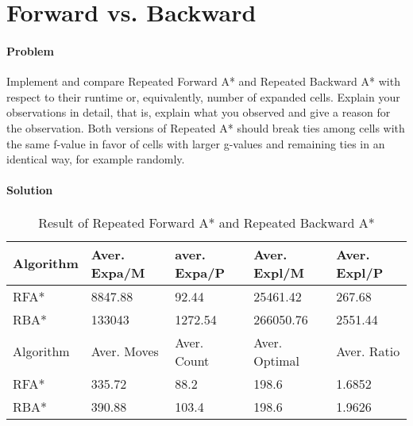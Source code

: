 \section{Forward vs. Backward}

\paragraph{Problem}
Implement and compare Repeated Forward A* and Repeated Backward A* with respect
to their runtime or, equivalently, number of expanded cells. Explain your
observations in detail, that is, explain what you observed and give a reason
for the observation. Both versions of Repeated A* should break ties among cells
with the same f-value in favor of cells with larger g-values and remaining ties
in an identical way, for example randomly.

\paragraph{Solution}

\begin{table}[h!]
\centering
\caption{Result of Repeated Forward A* and Repeated Backward A*}
\begin{tabular}{|l|l|l|l|l|}
\hline
Algorithm & Aver. Expa/M & aver. Expa/P & Aver. Expl/M & Aver. Expl/P \\
\hline
RFA* & 8847.88 & 92.44 & 25461.42 & 267.68 \\
\hline
RBA* & 133043 & 1272.54 & 266050.76 & 2551.44 \\
\hhline{|=|=|=|=|=|}
Algorithm & Aver. Moves & Aver. Count & Aver. Optimal & Aver. Ratio \\
\hline
RFA* & 335.72 & 88.2 & 198.6 & 1.6852 \\
\hline
RBA* & 390.88 & 103.4 & 198.6 & 1.9626 \\
\hline
\end{tabular}
\label{tbl:rpa-rba}
\end{table}
